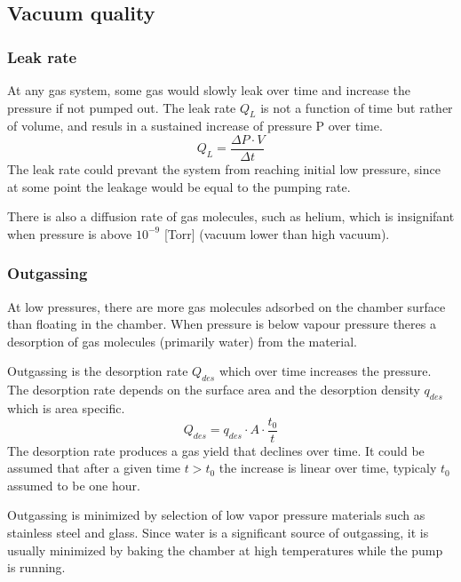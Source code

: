 \documentclass[\main/master.tex]{subfiles}
\begin{document}
\subsection{Vacuum quality}
\subsubsection{Leak rate}
At any gas system, some gas would slowly leak over time and increase the pressure if not pumped out. The leak rate $Q_L$ is not a function of time but rather of volume, and resuls in a sustained increase of pressure P over time.
\begin{equation}
Q_L = \frac{\Delta P\cdot V}{\Delta t}  \label{eqn:energy-mass-equivalence-relation}
\end{equation}
The leak rate could prevant the system from reaching initial low pressure, since at some point the leakage would be equal to the pumping rate.
\par\noindent
There is also a diffusion rate of gas molecules, such as helium, which is insignifant when pressure is above $10^{-9}$ [Torr] (vacuum lower than high vacuum). 

\subsubsection{Outgassing}
At low pressures, there are more gas molecules adsorbed on the chamber surface than floating in the chamber. When pressure is below vapour pressure theres a desorption of gas molecules (primarily water) from the material.
\par\noindent
Outgassing is the desorption rate $Q_{des}$ which over time increases the pressure. The desorption rate depends on the surface area and the desorption density $q_{des}$ which is area specific. 
\begin{equation}
Q_{des} = q_{des}\cdot A\cdot\frac{t_0}{t}  \label{eqn:energy-mass-equivalence-relation}
\end{equation}
The desorption rate produces a gas yield that declines over time. It could be assumed that after a given time $t>t_0$ the increase is linear over time, typicaly $t_0$ assumed to be one hour.
\par\noindent
Outgassing is minimized by selection of low vapor pressure materials such as stainless steel and glass. Since water is a significant source of outgassing, it is usually minimized by baking the chamber at high temperatures while the pump is running.
\end{document}
